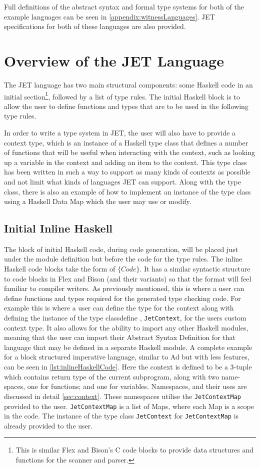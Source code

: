 Full definitions of the abstract syntax and formal type systems for both of the example languages can be seen in \autoref{appendix:witnessLanguages}.
JET specifications for both of these languages are also provided.

\section{Overview of the JET Language}
The JET language has two main structural components: some Haskell code in an initial section\footnote{This is similar Flex and Bison's C code blocks to provide data structures and functions for the scanner and parser.}, followed by a list of type rules.
The initial Haskell block is to allow the user to define functions and types that are to be used in the following type rules.

In order to write a type system in JET, the user will also have to provide a context type, which is an instance of a Haskell type class that defines a number of functions that will be useful when interacting with the context, such as looking up a variable in the context and adding an item to the context.
This type class has been written in such a way to support as many kinds of contexts as possible and not limit what kinds of languages JET can support.
Along with the type class, there is also an example of how to implement an instance of the type class using a Haskell Data Map\cite{haskelldatamap} which the user may use or modify.

\subsection{Initial Inline Haskell}
The block of initial Haskell code, during code generation, will be placed just under the module definition but before the code for the type rules.
The inline Haskell code blocks take the form of $\{Code\}$.
It has a similar syntactic structure to code blocks in Flex and Bison (and their variants) so that the format will feel familiar to compiler writers.
As previously mentioned, this is where a user can define functions and types required for the generated type checking code.
For example this is where a user can define the type for the context along with defining the instance of the type classdefine , \texttt{JetContext}, for the users custom context type.
It also allows for the ability to import any other Haskell modules, meaning that the user can import their Abstract Syntax Definition for that language that may be defined in a separate Haskell module.
A complete example for a block structured imperative language, similar to Ad but with less features, can be seen in \autoref{lst:inlineHaskellCode}.
Here the context is defined to be a 3-tuple which contains return type of the current subprogram, along with two name-spaces, one for functions; and one for variables.
Namespaces, and their uses are discussed in detail \autoref{sec:context}.
These namespaces utilise the \texttt{JetContextMap} provided to the user.
\texttt{JetContextMap} is a list of Maps, where each Map is a scope in the code.
The instance of the type class \texttt{JetContext} for \texttt{JetContextMap} is already provided to the user.

